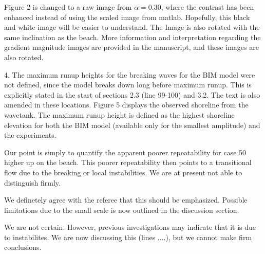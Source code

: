 \documentclass[11pt]{article}
\begin{document}
Figure 2 is changed to a raw image from $\alpha=0.30$, where the contrast has been enhanced instead of using the scaled image from matlab. Hopefully, this black and white image will be easier to understand. The Image is also rotated with the same inclination as the beach. More information and interpretation regarding the gradient magnitude images are provided in the manuscript, and these images are also rotated.



4. The maximum runup heights for the breaking waves for the BIM model were not defined, since the model breaks down long before maximum runup. This is explicitly stated in the start of sections 2.3 (line 99-100) and 3.2.  The text is also amended in these locations. Figure 5 displays the observed shoreline from the wavetank. The maximum runup height is defined as the highest shoreline elevation  for both the BIM model (available only for the smallest amplitude) and the experiments. 

Our point is simply to quantify the apparent poorer repeatability for case 50 higher up on the beach. This poorer repeatability then
points to a transitional flow due to the breaking or local instabilities. We are at present not able to
distinguish firmly.  


We definetely agree with the referee that this should be emphasized.
Possible limitations due to the small scale is now outlined in the discussion section.

We are not certain. However, previous investigations may indicate that it is due to instabilites. We are now discussing this (lines ....), but we cannot make 
firm conclusions. 
\end{document}
